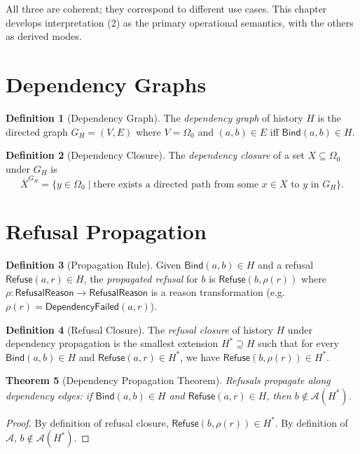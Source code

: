 \documentclass[12pt, a4paper, openany]{book}
\theoremstyle{plain}
\newtheorem{theorem}{Theorem}[chapter]
\theoremstyle{definition}
\newtheorem{definition}[theorem]{Definition}
\theoremstyle{remark}
\newcommand{\Refuse}{\mathsf{Refuse}}
\newcommand{\Bind}{\mathsf{Bind}}
\newcommand{\calA}{\mathcal{A}}
\begin{document}
All three are coherent; they correspond to different use cases. This chapter
develops interpretation (2) as the primary operational semantics, with the
others as derived modes.

\section{Dependency Graphs}

\begin{definition}[Dependency Graph]
The \emph{dependency graph} of history $H$ is the directed graph
$G_H = (V, E)$ where $V = \Omega_0$ and
$(a, b) \in E$ iff $\Bind(a, b) \in H$.
\end{definition}

\begin{definition}[Dependency Closure]
The \emph{dependency closure} of a set $X \subseteq \Omega_0$ under $G_H$ is
\[
\overline{X}^{G_H} = \{y \in \Omega_0 \mid \text{there exists a directed path from some } x \in X \text{ to } y \text{ in } G_H\}.
\]
\end{definition}

\section{Refusal Propagation}

\begin{definition}[Propagation Rule]
Given $\Bind(a, b) \in H$ and a refusal $\Refuse(a, r) \in H$, the
\emph{propagated refusal} for $b$ is $\Refuse(b, \rho(r))$ where
$\rho : \mathsf{RefusalReason} \to \mathsf{RefusalReason}$ is a reason
transformation (e.g.\ $\rho(r) = \mathsf{DependencyFailed}(a, r)$).
\end{definition}

\begin{definition}[Refusal Closure]
The \emph{refusal closure} of history $H$ under dependency propagation is the
smallest extension $H^* \supseteq H$ such that for every $\Bind(a, b) \in H$
and $\Refuse(a, r) \in H^*$, we have $\Refuse(b, \rho(r)) \in H^*$.
\end{definition}

\begin{theorem}[Dependency Propagation Theorem]
\label{thm:dep-propagation}
Refusals propagate along dependency edges: if $\Bind(a, b) \in H$ and
$\Refuse(a, r) \in H$, then $b \notin \calA(H^*)$.
\end{theorem}

\begin{proof}
By definition of refusal closure, $\Refuse(b, \rho(r)) \in H^*$.
By definition of $\calA$, $b \notin \calA(H^*)$.
\end{proof}
\end{document}
